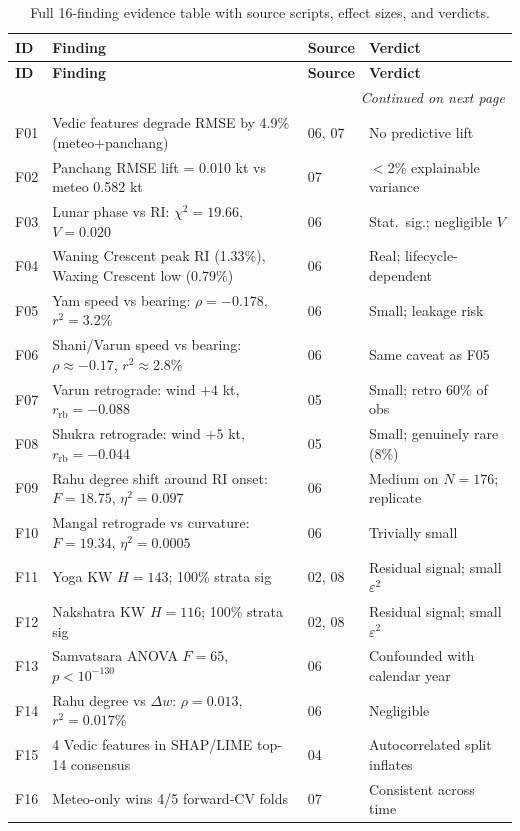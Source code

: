 \documentclass[12pt,a4paper]{article}
\begin{document}
    \begin{longtable}{p{2cm}p{5.5cm}lp{4cm}}
    \caption{Full 16-finding evidence table with source scripts, effect sizes,
    and verdicts.}
    \label{tab:evidence_full} \\
    \toprule
    \textbf{ID} & \textbf{Finding} & \textbf{Source} & \textbf{Verdict} \\
    \midrule
    \endfirsthead
    \toprule
    \textbf{ID} & \textbf{Finding} & \textbf{Source} & \textbf{Verdict} \\
    \midrule
    \endhead
    \midrule \multicolumn{4}{r}{\textit{Continued on next page}} \\
    \endfoot
    \bottomrule
    \endlastfoot
    F01 & Vedic features degrade RMSE by 4.9\% (meteo+panchang) & 06, 07 & No predictive lift \\
    F02 & Panchang RMSE lift = 0.010 kt vs meteo 0.582 kt & 07 & $<$2\% explainable variance \\
    F03 & Lunar phase vs RI: $\chi^2=19.66$, $V=0.020$ & 06 & Stat.\ sig.; negligible $V$ \\
    F04 & Waning Crescent peak RI (1.33\%), Waxing Crescent low (0.79\%) & 06 & Real; lifecycle-dependent \\
    F05 & Yam speed vs bearing: $\rho=-0.178$, $r^2=3.2\%$ & 06 & Small; leakage risk \\
    F06 & Shani/Varun speed vs bearing: $\rho\approx-0.17$, $r^2\approx2.8\%$ & 06 & Same caveat as F05 \\
    F07 & Varun retrograde: wind $+4$ kt, $r_\text{rb}=-0.088$ & 05 & Small; retro 60\% of obs \\
    F08 & Shukra retrograde: wind $+5$ kt, $r_\text{rb}=-0.044$ & 05 & Small; genuinely rare (8\%) \\
    F09 & Rahu degree shift around RI onset: $F=18.75$, $\eta^2=0.097$ & 06 & Medium on $N=176$; replicate \\
    F10 & Mangal retrograde vs curvature: $F=19.34$, $\eta^2=0.0005$ & 06 & Trivially small \\
    F11 & Yoga KW $H=143$; 100\% strata sig & 02, 08 & Residual signal; small $\varepsilon^2$ \\
    F12 & Nakshatra KW $H=116$; 100\% strata sig & 02, 08 & Residual signal; small $\varepsilon^2$ \\
    F13 & Samvatsara ANOVA $F=65$, $p<10^{-130}$ & 06 & Confounded with calendar year \\
    F14 & Rahu degree vs $\Delta w$: $\rho=0.013$, $r^2=0.017\%$ & 06 & Negligible \\
    F15 & 4 Vedic features in SHAP/LIME top-14 consensus & 04 & Autocorrelated split inflates \\
    F16 & Meteo-only wins 4/5 forward-CV folds & 07 & Consistent across time \\
    \end{longtable}

    
\end{document}
